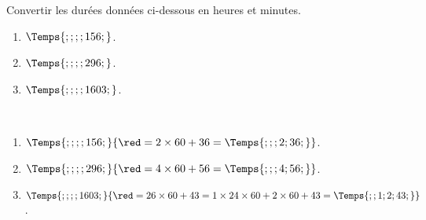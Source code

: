 \begin{exercice}
    Convertir les durées données ci-dessous en heures et minutes.
    \begin{enumerate}
       \item $\Temps{;;;;156;}$.
       \item $\Temps{;;;;296;}$.
       \item $\Temps{;;;;1603;}$.
    \end{enumerate}
 \end{exercice}
 
 \begin{corrige}
    \ \\ [-5mm]
    \begin{enumerate}
        \item $\Temps{;;;;156;} {\red = 2\times 60 + 36 = \Temps{;;;2;36;}}$.
        \item $\Temps{;;;;296;} {\red = 4\times 60 + 56 = \Temps{;;;4;56;}}$.
        \item $\Temps{;;;;1603;}{\red = 26\times 60 + 43 = 1\times 24\times 60 + 2\times 60 + 43 = \Temps{;;1;2;43;}}$.
     \end{enumerate}
 \end{corrige}